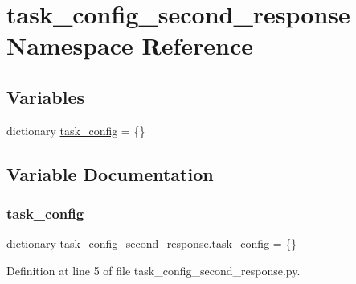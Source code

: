 \hypertarget{namespacetask__config__second__response}{}\section{task\+\_\+config\+\_\+second\+\_\+response Namespace Reference}
\label{namespacetask__config__second__response}
\subsection*{Variables}
\begin{DoxyCompactItemize}
\item 
dictionary \hyperlink{namespacetask__config__second__response_aca7ef394f34182953c1f0d555c2d51db}{task\+\_\+config} = \{\}
\end{DoxyCompactItemize}


\subsection{Variable Documentation}
\mbox{\label{namespacetask__config__second__response_aca7ef394f34182953c1f0d555c2d51db}} 
\subsubsection{\texorpdfstring{task\+\_\+config}{task\_config}}
{\footnotesize\ttfamily dictionary task\+\_\+config\+\_\+second\+\_\+response.\+task\+\_\+config = \{\}}



Definition at line 5 of file task\+\_\+config\+\_\+second\+\_\+response.\+py.

